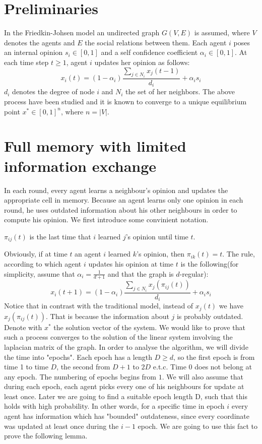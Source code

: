 \section{Preliminaries}
In the Friedkin-Johsen model an undirected graph $G(V,E)$ is assumed, where $V$ denotes the agents and $E$ the social relations between them. Each agent $i$ poses an internal opinion $s_i \in [0,1]$ and a self confidence coefficient $\alpha_i \in[0,1]$. At each time step $t\geq 1$, agent $i$ updates her opinion as follows: $$x_i(t) = (1-\alpha_i) \frac{\sum_{j \in N_i}x_j(t-1)}{d_i} + \alpha_i s_i$$ $d_i$ denotes the degree of node $i$ and $N_i$ the set of her neighbors. The above process have been studied and it is known to converge to a unique equilibrium point $x^* \in [0,1]^n$, where $n=|V|$. \\


\section{Full memory with limited information exchange}
In each round, every agent learns a neighbour's opinion and updates the appropriate cell in memory. Because an agent learns only one opinion in each round, he uses outdated information about his other neighbours in order to compute his opinion. We first introduce some convinient notation.
\begin{definition}
$\pi_{ij}(t)$ is the last time that $i$ learned $j$'s opinion until time $t$.
\end{definition}

Obviously, if at time $t$ an agent $i$ learned $k$'s opinion, then $\pi_{ik}(t) = t$. The rule, according to which agent $i$ updates his opinion at time $t$ is the following(for simplicity, assume that $\alpha_i = \frac{1}{d+1}$ and that the graph is $d$-regular):$$x_{i}(t+1)=(1-\alpha_i)\frac{\sum_{j \in N_i}x_j(\pi_{ij}(t))}{d_i}+\alpha_i s_i$$
Notice that in contrast with the traditional model, instead of $x_j(t)$ we have $x_j(\pi_{ij}(t))$. That is because the information about $j$ is probably outdated.
Denote with $x^*$ the solution vector of the system. We would like to prove that such a process converges to the solution of the linear system involving the laplacian matrix of the graph. In order to analyse the algorithm, we will divide the time into "epochs". Each epoch has a length $D \ge d$, so the first epoch is from time 1 to time $D$, the second from $D+1$ to $2D$ e.t.c. Time $0$ does not belong at any epoch. The numbering of epochs begins from $1$. We will also assume that during each epoch, each agent picks every one of his neighbours for update at least once. Later we are going to find a suitable epoch length D, such that this holds with high probability. In other words, for a specific time in epoch $i$ every agent has information which has "bounded" outdateness, since every coordinate was updated at least once during the $i-1$ epoch. We are going to use this fact to prove the following lemma.

